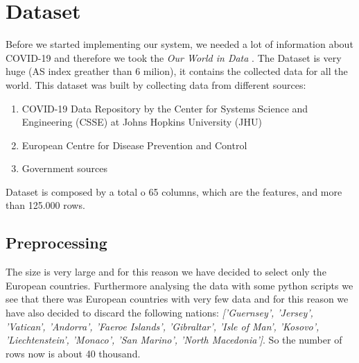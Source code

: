 \documentclass[10pt,conference]{IEEEtran}
\begin{document}
\section{Dataset}
Before we started implementing our system, we needed a lot of information about COVID-19 and therefore we took the  
{\it Our World in Data} \cite{dataset}. The Dataset is very huge (AS index greather than 6 milion), it contains the collected data for all the world. 
This dataset was built by collecting data from different sources:
\begin{enumerate}
	\item COVID-19 Data Repository by the Center for Systems Science and Engineering (CSSE) at Johns Hopkins University (JHU)
	\item European Centre for Disease Prevention and Control
	\item Government sources
\end{enumerate}
\bigskip
Dataset is composed by a total o 65 columns, which are the features, and more than 125.000 rows. 

\subsection{Preprocessing}
The size is very large and for this reason we have decided to select only the European countries. Furthermore analysing the data with some python scripts we see that there was European countries with very few data and for this reason we have also decided to discard the following nations:
{\em ['Guernsey', 'Jersey', 'Vatican', 'Andorra', 'Faeroe Islands', 'Gibraltar', 'Isle of Man', 'Kosovo', 'Liechtenstein', 'Monaco', 'San Marino', 'North Macedonia']}. 
So the number of rows now is about 40 thousand. 
\end{document}
